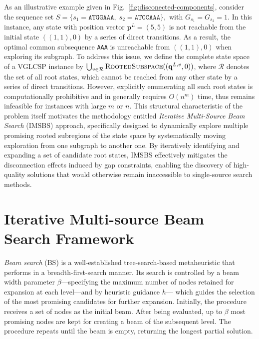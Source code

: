 \documentclass[runningheads]{llncs}
\begin{document}
As an illustrative example given in Fig.~\ref{fig:disconected-components}, consider the sequence set $S = \{ s_1 = \texttt{ATGGAAA},\; s_2 = \texttt{ATCCAAA} \},$
with  $G_{s_1} = G_{s_2} = {1}$. In this instance, any state with position vector $\mathbf{p}^L = (5,5)$ is not reachable from the initial state $((1,1),0)$ by a series of direct transitions. As a result, the optimal common subsequence \texttt{AAA} is unreachable from $((1,1),0)$  when exploring its subgraph. To address this issue, we define the complete state space of a VGLCSP instance by  
$\bigcup_{v \in \mathcal{R}} \textsc{RootedSubspace}((\mathbf{q}^{L, v},0))$,  
where $\mathcal{R}$ denotes the set of all root states,  
which cannot be reached from any other state by a series of direct transitions. However, explicitly enumerating all such root states is computationally prohibitive and in generally requires $O(n^m)$ time, thus remains infeasible for instances with large $m$ or $n$.  This structural characteristic of the problem itself motivates the methodology entitled \textit{Iterative Multi-Source Beam Search} (IMSBS) approach,  specifically designed to dynamically explore multiple promising rooted subregions of the state space by systematically moving exploration from one subgraph to another one. By iteratively identifying and expanding a set of candidate root states, IMSBS effectively mitigates the disconnection effects induced by gap constraints, enabling the discovery of high-quality solutions that would otherwise remain inaccessible to single-source search methods.


	
\section{Iterative Multi-source Beam Search Framework}\label{sec: imsbs}
	
	\textit{Beam search} (BS) is a well-established tree-search-based metaheuristic that performs in a breadth-first-search manner. Its search is controlled by a beam width parameter $\beta$---specifying the maximum number of nodes retained for expansion at each level---and by  heuristic guidance $h$--- which guides the selection of the most promising candidates for further expansion. Initially, the procedure receives a set of nodes as the initial beam. After being evaluated, up to $\beta$ most promising nodes are kept for creating a beam of the subsequent level. The procedure repeats until the beam is empty, returning the longest partial solution. 
\end{document}
